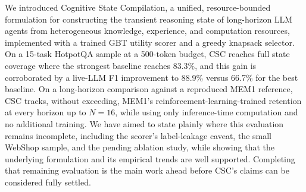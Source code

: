 \documentclass{article}
\begin{document}
We introduced Cognitive State Compilation, a unified, resource-bounded formulation for constructing the transient reasoning state of long-horizon LLM agents from heterogeneous knowledge, experience, and computation resources, implemented with a trained GBT utility scorer and a greedy knapsack selector. On a 15-task HotpotQA sample at a 500-token budget, CSC reaches full state coverage where the strongest baseline reaches 83.3\%, and this gain is corroborated by a live-LLM F1 improvement to 88.9\% versus 66.7\% for the best baseline. On a long-horizon comparison against a reproduced MEM1 reference, CSC tracks, without exceeding, MEM1's reinforcement-learning-trained retention at every horizon up to $N=16$, while using only inference-time computation and no additional training. We have aimed to state plainly where this evaluation remains incomplete, including the scorer's label-leakage caveat, the small WebShop sample, and the pending ablation study, while showing that the underlying formulation and its empirical trends are well supported. Completing that remaining evaluation is the main work ahead before CSC's claims can be considered fully settled.



\end{document}
